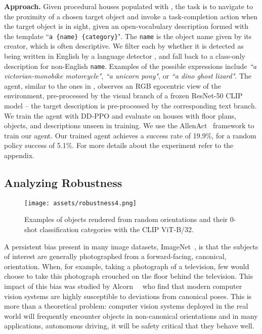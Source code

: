 \textbf{Approach.}
Given procedural houses populated with \datalvis, the task is to navigate to the proximity of a chosen target object and invoke a task-completion action when the target object is in sight, given an open-vocabulary description formed with the template ``\texttt{a \{name\} \{category\}}". The \texttt{name} is the object name given by its creator, which is often descriptive. We filter each by whether it is detected as being written in English by a language detector \cite{joulin2016bag, joulin2016fasttext}, and fall back to a class-only description for non-English \texttt{name}. Examples of the possible expressions include \emph{``a victorian-monobike motorcycle"}, \emph{``a unicorn pony"}, or \emph{``a dino ghost lizard"}. The agent, similar to the ones in \cite{Khandelwal2022SimpleBE}, observes an RGB egocentric view of the environment, pre-processed by the visual branch of a frozen ResNet-50 CLIP model \cite{radford2021learning} -- the target description is pre-processed by the corresponding text branch. We train the agent with DD-PPO \cite{Wijmans2020DDPPOLN} and evaluate on houses with floor plans, objects, and descriptions unseen in training. We use the AllenAct~\cite{AllenAct} framework to train our agent. Our trained agent achieves a success rate of 19.9\%, for a random policy success of 5.1\%. For more details about the experiment refer to the appendix.%

\vspace{-0.05in}

\subsection{Analyzing Robustness}

\vspace{-0.05in}

\begin{figure}[t!]
    \centering
    \texttt{[image: assets/robustness4.png]}
    \caption{Examples of objects rendered from random orientations and their 0-shot classification categories with the CLIP ViT-B/32.}
    \label{fig:robustness}
    \vspace{-1em}
\end{figure}

A persistent bias present in many image datasets, \eg ImageNet~\cite{russakovsky2015imagenet}, is that the subjects of interest are generally photographed from a forward-facing, canonical, orientation. When, for example, taking a photograph of a television, few would choose to take this photograph crouched on the floor behind the television. This impact of this bias was studied by Alcorn~\etal~\cite{Alcorn2019StrikeAPose} who find that modern computer vision systems are highly susceptible to deviations from canonical poses. This is more than a theoretical problem: computer vision systems deployed in the real world will frequently encounter objects in non-canonical orientations and in many applications, \eg autonomous driving, it will be safety critical that they behave well.

